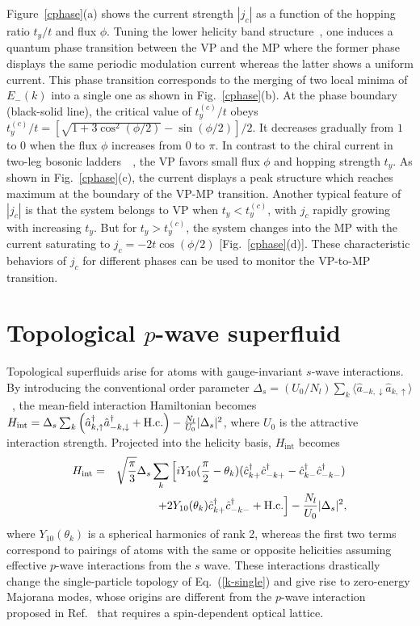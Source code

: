 \documentclass[twocolumn,prl,superscriptaddress,amsmath,amssymb]{revtex4} %
\begin{document}
Figure~\ref{cphase}(a) shows the current strength $|j_c|$ as a function of the hopping ratio $t_y/t$ and flux $\phi$. Tuning the lower helicity band structure~\cite{Atala14}, one induces a quantum phase transition between the VP and the MP where the former phase displays the same periodic modulation current whereas the latter shows a uniform current. This phase transition corresponds to the merging of two local minima of $E_-(k)$ into a single one as shown in Fig.~\ref{cphase}(b). At the phase boundary (black-solid line), the critical value of $t_y^{(c)}/t$ obeys $t^{(c)}_y/t=[\sqrt{1+3\cos^2(\phi/2)}-\sin(\phi/2)]/2$. It decreases gradually from $1$ to $0$ when the flux $\phi$ increases from $0$ to $\pi$. In contrast to the chiral current in two-leg bosonic ladders~~\cite{Atala14}, the VP favors small flux $\phi$ and hopping strength $t_y$. As shown in Fig.~\ref{cphase}(c), the current displays a peak structure which reaches maximum at the boundary of the VP-MP transition. Another typical feature of $|j_c|$ is that the system belongs to VP when $t_y<t_y^{(c)}$, with $j_c$ rapidly growing with increasing $t_y$. But for $t_y>t_y^{(c)}$, the system changes into the MP with the current saturating to $j_c=-2t\cos(\phi/2)$ [Fig.~\ref{cphase}(d)]. These characteristic behaviors of $j_c$ for different phases can be used to monitor the VP-to-MP transition.

\section{Topological $p$-wave superfluid}\label{tisup}
Topological superfluids arise for atoms with gauge-invariant $s$-wave interactions. By introducing the conventional order parameter $\Delta_{s}=(U_{0}/N_l)\sum_{{k}}\langle\hat{a}_{{-k},\downarrow}\hat{a}_{{ k},\uparrow}\rangle$~\cite{qzero}, the mean-field interaction Hamiltonian becomes ${H}_{\text{int}} = \Delta_{{s}} \sum_{k}\left(\hat{a}_{{k},\uparrow}^\dag \hat{a}_{{-k},\downarrow}^\dag +{\rm{H.c.}}\right) - \frac{N_l}{U_0}|\Delta_{s}|^2$, where $U_{0}$ is the attractive interaction strength. Projected into the helicity basis, ${H}_{\text{int}}$ becomes
\begin{eqnarray}
{{H}}_{\text{int}} &=& \sqrt{\frac{\pi}{3}}\Delta_s \sum_k\left[ iY_{10}(\frac{\pi}{2}-\theta_k)(\hat{c}^\dag_{k+}\hat{c}^\dag_{-k+}- \hat{c}^\dag_{k-}\hat{c}^\dag_{-k-}) \right. \nonumber \\ &&\left.+2Y_{10}(\theta_k)\hat{c}^\dag_{k+}\hat{c}^\dag_{-k-}+\rm{H.c.}\right]- \frac{N_l}{U_0}|\Delta_{s}|^2,\label{pwave}
\end{eqnarray}
where $Y_{10}(\theta_k)$ is a spherical harmonics of rank 2, whereas the first two terms correspond to pairings of atoms with the same or opposite helicities assuming effective $p$-wave interactions from the $s$ wave. These interactions drastically change the single-particle topology of Eq.~(\ref{k-single}) and give rise to zero-energy Majorana modes, whose origins are different from the $p$-wave interaction proposed in Ref.~\cite{Wang16} that requires a spin-dependent optical lattice.
\end{document}
